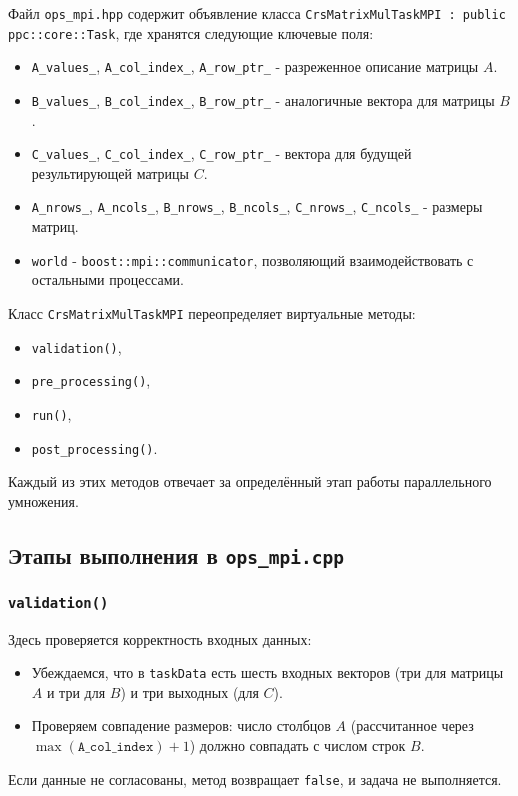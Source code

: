 \documentclass[12pt]{article}
\begin{document}
Файл \texttt{ops\_mpi.hpp} содержит объявление класса 
\texttt{CrsMatrixMulTaskMPI : public ppc::core::Task}, где хранятся следующие ключевые поля:
\begin{itemize}
    \item \texttt{A\_values\_}, \texttt{A\_col\_index\_}, \texttt{A\_row\_ptr\_} - разреженное описание матрицы \(A\).
    \item \texttt{B\_values\_}, \texttt{B\_col\_index\_}, \texttt{B\_row\_ptr\_} - аналогичные вектора для матрицы \(B\).
    \item \texttt{C\_values\_}, \texttt{C\_col\_index\_}, \texttt{C\_row\_ptr\_} - вектора для будущей результирующей матрицы \(C\).
    \item \texttt{A\_nrows\_}, \texttt{A\_ncols\_}, \texttt{B\_nrows\_}, \texttt{B\_ncols\_}, \texttt{C\_nrows\_}, \texttt{C\_ncols\_} - размеры матриц.
    \item \texttt{world} - \texttt{boost::mpi::communicator}, позволяющий взаимодействовать с остальными процессами.
\end{itemize}

Класс \texttt{CrsMatrixMulTaskMPI} переопределяет виртуальные методы:
\begin{itemize}
    \item \texttt{validation()},
    \item \texttt{pre\_processing()},
    \item \texttt{run()},
    \item \texttt{post\_processing()}.
\end{itemize}
Каждый из этих методов отвечает за определённый этап работы параллельного умножения.

\subsection{Этапы выполнения в \texttt{ops\_mpi.cpp}}

\subsubsection{\texttt{validation()}}
Здесь проверяется корректность входных данных:
\begin{itemize}
    \item Убеждаемся, что в \texttt{taskData} есть шесть входных векторов (три для матрицы \(A\) и три для \(B\)) и три выходных (для \(C\)).
    \item Проверяем совпадение размеров: число столбцов \(A\) (рассчитанное через \(\max(\texttt{A\_col\_index}) + 1\)) должно совпадать с числом строк \(B\).
\end{itemize}
Если данные не согласованы, метод возвращает \texttt{false}, и задача не выполняется.
\end{document}
